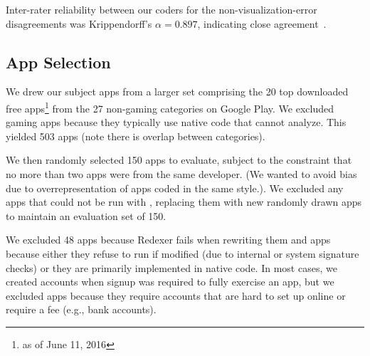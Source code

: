 Inter-rater reliability between our coders for the non-visualization-error 
disagreements was Krippendorff's $\alpha=0.897$, indicating close agreement~\cite{kripalpha}.

 
\subsection{App Selection}

We drew our subject apps from a larger set comprising the 20 top
downloaded free apps\footnote{as of June 11, 2016} from the
27 non-gaming categories on Google Play. We excluded gaming apps
because they typically use native code that \apptracer{} cannot
analyze. This yielded 503 apps (note there is overlap between
categories).


We then randomly selected 150 apps to evaluate, subject to the 
constraint that no more than two apps were from the
same developer. (We wanted to avoid bias due to overrepresentation of
apps coded in the same style.). We excluded any 
apps that could not be run with \apptracer{}, replacing them with 
new randomly drawn apps to maintain an evaluation set of 150. 

We excluded 48 apps because Redexer fails when rewriting them and
\unusableerrors{} apps because either they refuse to run if modified
(due to internal or system signature checks) or they are primarily
implemented in native code. 
In most cases, we created accounts when signup was required to fully exercise an app, but we 
excluded \accountserrors{} apps because they require accounts that are hard
to set up online or require a fee (e.g., bank accounts).



